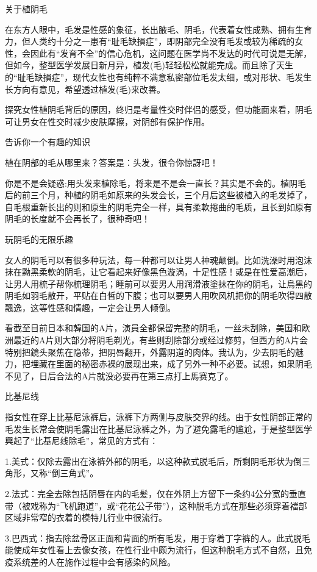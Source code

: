 \documentclass[12pt,UTF8]{ctexbook}
\begin{document}
关于植阴毛

在东方人眼中，毛发是性感的象征，长出腋毛、阴毛，代表着女性成熟、拥有生育力，但人类约十分之一患有“耻毛缺損症”，即阴部完全没有毛发或较为稀疏的女性，会因此有“发育不全”的信心危机，这问题在医学尚不发达的时代可说是无解，但如今，整型医学发展日新月异，植发(毛)轻轻松松就能完成。而且除了天生的“耻毛缺損症”，现代女性也有纯粹不满意私密部位毛发太细，或对形状、毛发生长方向有意见，希望透过植发(毛)来改善。

探究女性植阴毛背后的原因，终归是考量性交时伴侣的感受，但功能面来看，阴毛可让男女在性交时减少皮肤摩擦，对阴部有保护作用。

告诉你一个有趣的知识

植在阴部的毛从哪里来？答案是：头发，很令你惊訝吧！

你是不是会疑惑:用头发来植除毛，将来是不是会一直长？其实是不会的。植阴毛后的前三个月，种植的阴毛如原来的头发会长，三个月后这些被植入的毛发掉了，自毛根重新长出的则和原生的阴毛完全一样，具有柔軟捲曲的毛质，且长到如原有阴毛的长度就不会再长了，很种奇吧！

玩阴毛的无限乐趣

女人的阴毛可以有很多种玩法，每一种都可以让男人神魂颠倒。比如洗澡时用泡沫抹在黝黑柔軟的阴毛，让它看起来好像黑色漩涡，十足性感！或是在性爱高潮后，让男人用梳子帮你梳理阴毛；睡前可以要男人用润滑液塗抹在你的阴毛，让烏黑的阴毛如羽毛散开，平贴在白皙的下腹；也可以要男人用吹风机把你的阴毛吹得四散飄逸，这等性感和情趣，一定会让男人倾倒。

看截至目前日本和韓国的A片，演員全都保留完整的阴毛，一丝未刮除，美国和欧洲最近的A片则大部分将阴毛剃光，有些则刮除部分或经过修剪，但西方的A片会特别把鏡头聚焦在隐蒂，把阴唇翻开，外露阴道的肉体。我认为，少去阴毛的魅力，把埋藏在里面的秘密赤裸的展现出来，成了另外一种不必要。试想，如果阴毛不见了，日后合法的A片就没必要再在第三点打上馬赛克了。

比基尼线

指女性在穿上比基尼泳裤后，泳裤下方两侧与皮肤交界的线。由于女性阴部正常的毛发生长常会使阴毛露出在比基尼泳裤之外，为了避免露毛的尴尬，于是整型医学興起了“比基尼线除毛”，常见的方式有：

1.美式：仅除去露出在泳裤外部的阴毛，以这种款式脱毛后，所剩阴毛形状为倒三角形，又称“倒三角式”。

2.法式：完全去除包括阴唇在内的毛髪，仅在外阴上方留下一条约4公分宽的垂直带（被戏称为“飞机跑道”，或“花花公子带”），这种脱毛方式在那些必须穿着襠部区域非常窄的衣着的模特儿行业中很流行。

3.巴西式：指去除盆骨区正面和背面的所有毛发，用于穿着丁字裤的人。此式脱毛能使成年女性看上去像女孩，在性行业中颇为流行，但这种脱毛方式不自然，且免疫系统差的人在施作过程中会有感染的风险。
\end{document}
